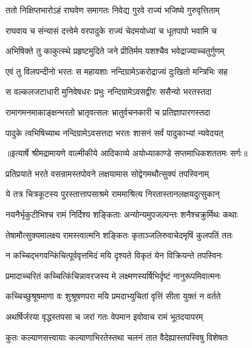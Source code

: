 \twolineshloka
{ततो निक्षिप्तभारोऽहं राघवेण समागतः}
{निवेद्य गुरवे राज्यं भजिष्ये गुरुवृत्तिताम्} %

\twolineshloka
{राघवाय च संन्यासं दत्त्वेमे वरपादुके}
{राज्यं चेदमयोध्यां च धूतपापो भवामि च} %

\twolineshloka
{अभिषिक्ते तु काकुत्स्थे प्रहृष्टमुदिते जने}
{प्रीतिर्मम यशश्चैव भवेद्राज्याच्चतुर्गुणम्} %

\twolineshloka
{एवं तु विलपन्दीनो भरतः स महायशाः}
{नन्दिग्रामेऽकरोद्राज्यं दुःखितो मन्त्रिभिः सह} %

\twolineshloka
{स वल्कलजटाधारी मुनिवेषधरः प्रभुः}
{नन्दिग्रामेऽवसद्वीरः ससैन्यो भरतस्तदा} %

\twolineshloka
{रामागमनमाकाङ्क्षन्भरतो भ्रातृवत्सलः}
{भ्रातुर्वचनकारी च प्रतिज्ञापारगस्तदा} %

\twolineshloka
{पादुके त्वभिषिच्याथ नन्दिग्रामेऽवसत्तदा}
{भरतः शासनं सर्वं पादुकाभ्यां न्यवेदयत्} %


{॥इत्यार्षे श्रीमद्रामायणे वाल्मीकीये आदिकाव्ये अयोध्याकाण्डे सप्तमाधिकशततमः सर्गः॥}


\twolineshloka
{प्रतिप्रयाते भरते वसन्रामस्तपोवने}
{लक्षयामास सोद्वेगमथौत्सुक्यं तपस्विनाम्} %

\twolineshloka
{ये तत्र चित्रकूटस्य पुरस्तात्तापसाश्रमे}
{राममाश्रित्य निरतास्तानलक्षयदुत्सुकान्} %

\twolineshloka
{नयनैर्भृकुटीभिश्च रामं निर्दिश्य शङ्किताः}
{अन्योन्यमुपजल्पन्तः शनैश्चक्रुर्मिथः कथाः} %

\twolineshloka
{तेषामौत्सुक्यमालक्ष्य रामस्त्वात्मनि शङ्कितः}
{कृताञ्जलिरुवाचेदमृषिं कुलपतिं ततः} %

\twolineshloka
{न कच्चिद्भगवन्किंचित्पूर्ववृत्तमिदं मयि}
{दृश्यते विकृतं येन विक्रियन्ते तपस्विनः} %

\twolineshloka
{प्रमादाच्चरितं कच्चित्किंचिन्नावरजस्य मे}
{लक्ष्मणस्यर्षिभिर्दृष्टं नानुरूपमिवात्मनः} %

\twolineshloka
{कच्चिच्छुश्रूषमाणा वः शुश्रूषणपरा मयि}
{प्रमदाभ्युचितां वृत्तिं सीता युक्तं न वर्तते} %

\twolineshloka
{अथर्षिर्जरया वृद्धस्तपसा च जरां गतः}
{वेपमान इवोवाच रामं भूतदयापरम्} %

\twolineshloka
{कुतः कल्याणसत्त्वायाः कल्याणाभिरतेस्तथा}
{चलनं तात वैदेह्यास्तपस्विषु विशेषतः} %

